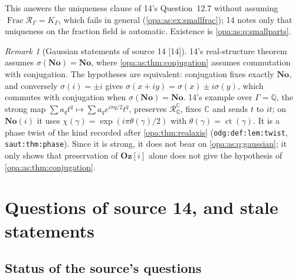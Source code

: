\documentclass[11pt,oneside]{article}
\numberwithin{equation}{section}
\theoremstyle{definition}
\theoremstyle{remark}
\newtheorem{remark}[remark]{Remark}
\newcommand{\No}{\mathbf{No}}
\newcommand{\Og}{\mathbf{Oz}[i]}
\newcommand{\SC}{\mathbf{No}(i)}
\newcommand{\C}{\mathbb C}
\newcommand{\Q}{\mathbb Q}
\newcommand{\ct}{\operatorname{ct}}
\newcommand{\Frac}{\operatorname{Frac}}
\newcommand{\src}[1]{\textup{\textsf{\small[#1]}}}
\newcommand{\lbl}[1]{\nolinkurl{#1}}
\begin{document}
This answers the uniqueness clause of 14's Question~12.7 without assuming
$\Frac\mathcal R_\Gamma=K_\Gamma$, which fails in general (\cref{opa:as:ex:smallfrac}); 14 notes
only that uniqueness on the fraction field is automatic. Existence is
\cref{opa:as:q:smallparts}.

\begin{remark}[Gaussian statements of source 14 \src{14}]\label{opa:cm:rem:gaussian}
14's real-structure theorem assumes $\sigma(\No)=\No$, where \cref{opa:as:thm:conjugation}
assumes commutation with conjugation. The hypotheses are equivalent: conjugation fixes exactly
$\No$, and conversely $\sigma(i)=\pm i$ gives $\sigma(x+iy)=\sigma(x)\pm i\sigma(y)$, which commutes
with conjugation when $\sigma(\No)=\No$. 14's example over $\Gamma=\Q$, the strong map
$\sum a_qt^q\mapsto\sum a_qe^{i\pi q/2}t^q$, preserves $\mathcal R^\C_\Q$, fixes $\C$ and sends
$t$ to $it$; on $\SC$ it uses $\chi(\gamma)=\exp(i\pi\theta(\gamma)/2)$ with $\theta(\gamma)=\ct(\gamma)$.
It is a phase twist of the kind recorded after \cref{opa:thm:realaxis}
(\lbl{odg:def:lem:twist}, \lbl{saut:thm:phase}). Since it is strong, it does not bear on
\cref{opa:as:q:gaussian}; it only shows that preservation of $\Og$ alone does not give the
hypothesis of \cref{opa:as:thm:conjugation}.
\end{remark}

\section{Questions of source 14, and stale statements}\label{opa:cm:sec:questions}

\subsection{Status of the source's questions}\label{opa:cm:sub:status}
\end{document}
